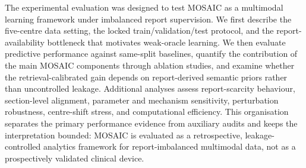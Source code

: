 \documentclass[11pt, a4paper]{article}
\theoremstyle{plain}
\theoremstyle{definition}
\begin{document}
The experimental evaluation was designed to test MOSAIC as a multimodal learning framework under imbalanced report supervision. We first describe the five-centre data setting, the locked train/validation/test protocol, and the report-availability bottleneck that motivates weak-oracle learning. We then evaluate predictive performance against same-split baselines, quantify the contribution of the main MOSAIC components through ablation studies, and examine whether the retrieval-calibrated gain depends on report-derived semantic priors rather than uncontrolled leakage. Additional analyses assess report-scarcity behaviour, section-level alignment, parameter and mechanism sensitivity, perturbation robustness, centre-shift stress, and computational efficiency. This organisation separates the primary performance evidence from auxiliary audits and keeps the interpretation bounded: MOSAIC is evaluated as a retrospective, leakage-controlled analytics framework for report-imbalanced multimodal data, not as a prospectively validated clinical device.
\end{document}
